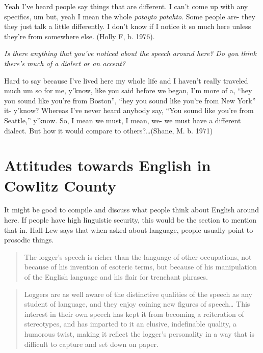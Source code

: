  
 
\begin{num_quote}
    Yeah I've heard people say things that are different. I can't come up with any specifics, um but, yeah I mean the whole \textit{potayto} \textit{potahto}. Some people are- they they just talk a little differently. I don't know if I notice it so much here unless they're from somewhere else. (Holly F, b. 1976).
\end{num_quote}


\begin{num_quote}
    \textit{Is there anything that you've noticed about the speech around here? Do you think there's much of a dialect or an accent?}
    
    Hard to say because I've lived here my whole life and I haven't really traveled much um so for me, y'know, like you said before we began, I'm more of a, ``hey you sound like you're from Boston'', ``hey you sound like you're from New York'' it- y'know? Whereas I've never heard anybody say, ``You sound like you're from Seattle,'' y'know. So, I mean we must, I mean, we- we must have a different dialect. But how it would compare to others?\ldots (Shane, M. b. 1971)
\end{num_quote}









\section{Attitudes towards English in Cowlitz County}

It might be good to compile and discuss what people think about English around here. If people have high linguistic security, this would be the section to mention that in. Hall-Lew \citep[75]{hall_lew_2009_diss} says that when asked about language, people usually point to prosodic things. 

\begin{quote}
The logger's speech is richer than the language of other occupations, not because of his invention of esoteric terms, but because of his manipulation of the English language and his flair for trenchant phrases. \citep[114]{davis_1950}
\end{quote}

\begin{quote}
Loggers are as well aware of the distinctive qualities of the speech as any student of language, and they enjoy coining new figures of speech… This interest in their own speech has kept it from becoming a reiteration of stereotypes, and has imparted to it an elusive, indefinable quality, a humorous twist, making it reflect the logger's personality in a way that is difficult to capture and set down on paper. \citep[114]{davis_1950}
\end{quote}




